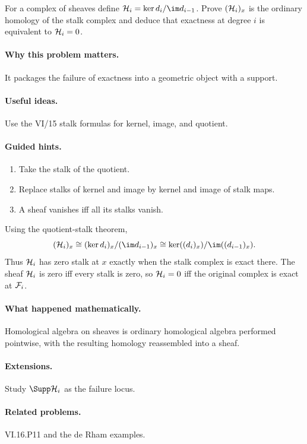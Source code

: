 \begin{problem}\label{prob:vi16-p10}
For a complex of sheaves define $\HH_i=\ker d_i/\im d_{i-1}$.  Prove $(\mathcal H_i)_x$ is the ordinary homology of the stalk complex and deduce that exactness at degree $i$ is equivalent to $\mathcal H_i=0$.
\end{problem}

\ifdefined\FullProblemDossiers
\paragraph{Why this problem matters.}
It packages the failure of exactness into a geometric object with a support.

\paragraph{Useful ideas.}
Use the VI/15 stalk formulas for kernel, image, and quotient.

\paragraph{Guided hints.}
\begin{enumerate}
\item Take the stalk of the quotient.
\item Replace stalks of kernel and image by kernel and image of stalk maps.
\item A sheaf vanishes iff all its stalks vanish.
\end{enumerate}

\begin{solution}
Using the quotient-stalk theorem,
\[
(\HH_i)_x\cong(\ker d_i)_x/(\im d_{i-1})_x
\cong\ker((d_i)_x)/\im((d_{i-1})_x).
\]
Thus $\mathcal H_i$ has zero stalk at $x$ exactly when the stalk complex is exact there.  The sheaf $\mathcal H_i$ is zero iff every stalk is zero, so $\mathcal H_i=0$ iff the original complex is exact at $\mathcal F_i$.
\end{solution}

\paragraph{What happened mathematically.}
Homological algebra on sheaves is ordinary homological algebra performed pointwise, with the resulting homology reassembled into a sheaf.

\paragraph{Extensions.}
Study $\Supp\HH_i$ as the failure locus.

\paragraph{Related problems.}
VI.16.P11 and the de Rham examples.
\fi
